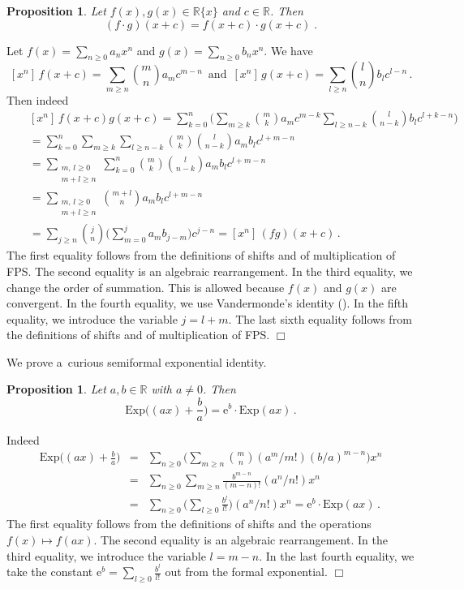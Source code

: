 \documentclass[10pt]{article}
\def\R{\mathbb{R}}
\def\proof{\par\noindent{\em Proof. }}
\def\eproof{\hfill{$\Box$}\bigskip}
\newtheorem{prop}[thm]{Proposition}
\begin{document}
\begin{prop}\label{prop_AddaSoucin}
Let $f(x),g(x)\in\R\{x\}$ and $c\in\R$. Then 
$$
(f\cdot g)(x+c)=f(x+c)\cdot g(x+c)\;.
$$
    
\end{prop}
\proof
Let $f(x)=\sum_{n\ge0}a_nx^n$ and $g(x)=\sum_{n\ge0}b_nx^n$. We have  
$$
{\textstyle
[x^n]\,f(x+c)=\sum_{m\ge n}\binom{m}{n}a_mc^{m-n}
\,\text{ and }\,[x^n]\,g(x+c)=\sum_{l\ge n}
\binom{l}{n}b_lc^{l-n}\,.
}
$$
Then indeed 
\begin{eqnarray*}
&&{\textstyle
[x^n]\,f(x+c)g(x+c)=\sum_{k=0}^n\big(\sum_{m\ge k}\binom{m}{k}a_mc^{m-k}
\sum_{l\ge n-k}\binom{l}{n-k}b_lc^{l+k-n}\big)}\\
&&{\textstyle
=\sum_{k=0}^n\sum_{m\ge k}\sum_{l\ge n-k}\binom{m}{k}
\binom{l}{n-k}a_mb_lc^{l+m-n}}\\
&&{\textstyle
=\sum_{\substack{m,\,l\ge0\\m+l\ge n}}\sum_{k=0}^n
\binom{m}{k}\binom{l}{n-k}a_m b_lc^{l+m-n}}\\
&&{\textstyle
=\sum_{\substack{m,\,l\ge0\\m+l\ge n}}\binom{m+l}{n}a_mb_lc^{l+m-n}}\\
&&{\textstyle=
\sum_{j\ge n}\binom{j}{n}\big(\sum_{m=0}^j
a_mb_{j-m}\big)c^{j-n}=[x^n]\,(fg)(x+c)\,.}
\end{eqnarray*}
The first equality follows from the definitions of shifts and of multiplication of FPS. The second 
equality is an algebraic rearrangement. In the third 
equality, we change the order of summation. This is allowed because 
$f(x)$ and $g(x)$ are convergent. In the fourth 
equality, we use Vandermonde's identity (\cite{vdmonde}). In the 
fifth equality, we introduce the variable $j=l+m$. The last sixth 
equality follows from the 
definitions of shifts  and of multiplication of FPS.
\eproof

We prove a~curious semiformal exponential identity.

\begin{prop}\label{prop_expIdenForm}
Let $a,b\in\R$ with $a\ne0$. Then
$${\textstyle
\mathrm{Exp}\big((ax)+\frac{b}{a}\big)=\mathrm{e}^b\cdot
\mathrm{Exp}(ax)\,.
}
$$
\end{prop}
\proof
Indeed
\begin{eqnarray*}
{\textstyle
\mathrm{Exp}\big((ax)+\frac{b}{a}\big)}&=&{\textstyle \sum_{n\ge0}\big(\sum_{m\ge n}\binom{m}{n}(a^m/m!)(b/a)^{m-n}\big)x^n}\\
&=&{\textstyle
\sum_{n\ge0}\sum_{m\ge n}\frac{b^{m-n}}{(m-n)!}(a^n/n!)x^n}\\
&=&{\textstyle
\sum_{n\ge0}\big(\sum_{l\ge0}\frac{b^l}{l!}\big)
(a^n/n!)x^n}=\mathrm{e}^b\cdot
\mathrm{Exp}(ax)\,.
\end{eqnarray*} 
The first equality follows from the definitions of shifts and the 
operations $f(x)\mapsto f(ax)$.  The second equality is an algebraic 
rearrangement. In the 
third equality, we introduce the variable $l=m-n$. In the last
fourth equality, we take the constant $\mathrm{e}^b=
\sum_{l\ge0}\frac{b^l}{l!}$ out from the formal exponential. 
\eproof
\end{document}
